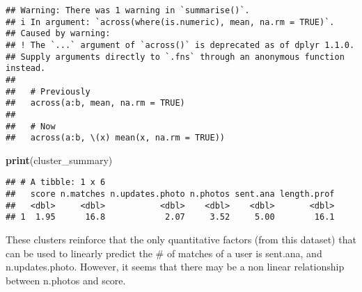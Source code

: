 \documentclass[
]{article}
\newenvironment{Shaded}{\begin{snugshade}}{\end{snugshade}}
\newcommand{\FunctionTok}[1]{\textcolor[rgb]{0.13,0.29,0.53}{\textbf{#1}}}
\newcommand{\NormalTok}[1]{#1}
\begin{document}
\begin{verbatim}
## Warning: There was 1 warning in `summarise()`.
## i In argument: `across(where(is.numeric), mean, na.rm = TRUE)`.
## Caused by warning:
## ! The `...` argument of `across()` is deprecated as of dplyr 1.1.0.
## Supply arguments directly to `.fns` through an anonymous function instead.
## 
##   # Previously
##   across(a:b, mean, na.rm = TRUE)
## 
##   # Now
##   across(a:b, \(x) mean(x, na.rm = TRUE))
\end{verbatim}

\begin{Shaded}
\begin{Highlighting}[]
\FunctionTok{print}\NormalTok{(cluster\_summary)}
\end{Highlighting}
\end{Shaded}

\begin{verbatim}
## # A tibble: 1 x 6
##   score n.matches n.updates.photo n.photos sent.ana length.prof
##   <dbl>     <dbl>           <dbl>    <dbl>    <dbl>       <dbl>
## 1  1.95      16.8            2.07     3.52     5.00        16.1
\end{verbatim}

These clusters reinforce that the only quantitative factors (from this
dataset) that can be used to linearly predict the \# of matches of a
user is sent.ana, and n.updates.photo. However, it seems that there may
be a non linear relationship between n.photos and score.
\end{document}
